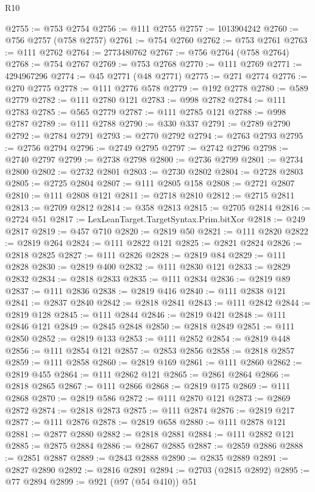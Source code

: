 \begin{lexlean}{R10}
\begin{coremodule}
@2755 := @753 @2754
@2756 := @111 @2755
@2757 := 1013904242
@2760 := @756 @2757 (@758 @2757)
@2761 := @754 @2760
@2762 := @753 @2761
@2763 := @111 @2762
@2764 := 2773480762
@2767 := @756 @2764 (@758 @2764)
@2768 := @754 @2767
@2769 := @753 @2768
@2770 := @111 @2769
@2771 := 4294967296
@2774 := @45 @2771 (@48 @2771)
@2775 := @271 @2774
@2776 := @270 @2775
@2778 := @111 @2776 @578
@2779 := @192 @2778
@2780 := @589 @2779
@2782 := @111 @2780 @121
@2783 := @998 @2782
@2784 := @111 @2783
@2785 := @565 @2779
@2787 := @111 @2785 @121
@2788 := @998 @2787
@2789 := @111 @2788
@2790 := @330 @337
@2791 := @2789 @2790
@2792 := @2784 @2791
@2793 := @2770 @2792
@2794 := @2763 @2793
@2795 := @2756 @2794
@2796 := @2749 @2795
@2797 := @2742 @2796
@2798 := @2740 @2797
@2799 := @2738 @2798
@2800 := @2736 @2799
@2801 := @2734 @2800
@2802 := @2732 @2801
@2803 := @2730 @2802
@2804 := @2728 @2803
@2805 := @2725 @2804
@2807 := @111 @2805 @158
@2808 := @2721 @2807
@2810 := @111 @2808 @121
@2811 := @2718 @2810
@2812 := @2715 @2811
@2813 := @2709 @2812
@2814 := @358 @2813
@2815 := @2705 @2814
@2816 := @2724 @51
@2817 := LexLeanTarget.TargetSyntax.Prim.bitXor
@2818 := @249 @2817
@2819 := @457 @710
@2820 := @2819 @50
@2821 := @111 @2820
@2822 := @2819 @264
@2824 := @111 @2822 @121
@2825 := @2821 @2824
@2826 := @2818 @2825
@2827 := @111 @2826
@2828 := @2819 @84
@2829 := @111 @2828
@2830 := @2819 @400
@2832 := @111 @2830 @121
@2833 := @2829 @2832
@2834 := @2818 @2833
@2835 := @111 @2834
@2836 := @2819 @89
@2837 := @111 @2836
@2838 := @2819 @416
@2840 := @111 @2838 @121
@2841 := @2837 @2840
@2842 := @2818 @2841
@2843 := @111 @2842
@2844 := @2819 @128
@2845 := @111 @2844
@2846 := @2819 @421
@2848 := @111 @2846 @121
@2849 := @2845 @2848
@2850 := @2818 @2849
@2851 := @111 @2850
@2852 := @2819 @133
@2853 := @111 @2852
@2854 := @2819 @448
@2856 := @111 @2854 @121
@2857 := @2853 @2856
@2858 := @2818 @2857
@2859 := @111 @2858
@2860 := @2819 @169
@2861 := @111 @2860
@2862 := @2819 @455
@2864 := @111 @2862 @121
@2865 := @2861 @2864
@2866 := @2818 @2865
@2867 := @111 @2866
@2868 := @2819 @175
@2869 := @111 @2868
@2870 := @2819 @586
@2872 := @111 @2870 @121
@2873 := @2869 @2872
@2874 := @2818 @2873
@2875 := @111 @2874
@2876 := @2819 @217
@2877 := @111 @2876
@2878 := @2819 @658
@2880 := @111 @2878 @121
@2881 := @2877 @2880
@2882 := @2818 @2881
@2884 := @111 @2882 @121
@2885 := @2875 @2884
@2886 := @2867 @2885
@2887 := @2859 @2886
@2888 := @2851 @2887
@2889 := @2843 @2888
@2890 := @2835 @2889
@2891 := @2827 @2890
@2892 := @2816 @2891
@2894 := @2703 (@2815 @2892)
@2895 := @77 @2894
@2899 := @921 (@97 (@54 @410)) @51

\end{coremodule}
\end{lexlean}
